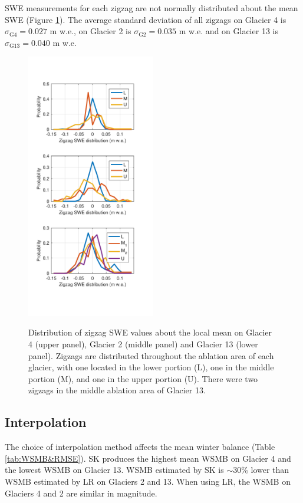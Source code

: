 \documentclass[twocolumn,letterpaper]{igs}
\begin{document}
SWE measurements for each zigzag are not normally distributed about the mean SWE (Figure \ref{fig:ZigzagHistogram}). The average standard deviation of all zigzags on Glacier 4 is $\sigma_{\mathrm{G4}} =  0.027$ m w.e., on Glacier 2 is $\sigma_{\mathrm{G2}} =  0.035$ m w.e. and on Glacier 13 is $\sigma_{\mathrm{G13}} =  0.040$ m w.e.

\begin{figure}
	\centering
	\includegraphics[width =0.5\textwidth]{ZigzagHistogram.pdf}\\
	\caption{Distribution of zigzag SWE values about the local mean on Glacier 4 (upper panel), Glacier 2 (middle panel) and Glacier 13 (lower panel). Zigzags are distributed throughout the ablation area of each glacier, with one located in the lower portion (L), one in the middle portion (M), and one in the upper portion (U). There were two zigzags in the middle ablation area of Glacier 13.}
	\label{fig:ZigzagHistogram}
\end{figure}

\subsection{Interpolation}

The choice of interpolation method affects the mean winter balance (Table \ref{tab:WSMB&RMSE}). SK produces the highest mean WSMB on Glacier 4 and the lowest WSMB on Glacier 13. WSMB estimated by SK is $\sim$30\% lower than WSMB estimated by LR on Glaciers 2 and 13. When using LR, the WSMB on Glaciers 4 and 2 are similar in magnitude.
\end{document}
